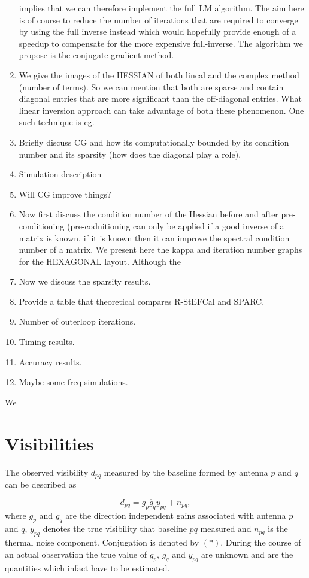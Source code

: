 \documentclass[useAMS,usenatbib]{mn2e}
\newcommand{\conj}[1]{\overline{#1}}
\begin{document}
\begin{enumerate}
 implies that we can therefore implement the full LM algorithm. The aim here is of course to reduce the number of iterations that are required to converge by using the 
 full inverse instead which would hopefully provide enough of a speedup to compensate for the more expensive full-inverse. The algorithm we propose is the conjugate 
 gradient method.
 \item We give the images of the HESSIAN of both lincal and the complex method (number of terms). So we can mention that both are sparse and contain diagonal entries that 
 are more significant than the off-diagonal entries. What linear inversion approach can take advantage of both these phenomenon. One such technique is 
 cg. 
 \item Briefly discuss CG and how its computationally bounded by its condition number and its sparsity (how does the diagonal play a role).
 \item Simulation description
 \item Will CG improve things?
 \item Now first discuss the condition
 number of the Hessian before and after pre-conditioning (pre-codnitioning can only be applied if a good inverse of a matrix is known, if it is known then it can improve 
 the spectral condition number of a matrix. We present here the kappa and iteration number graphs for the HEXAGONAL layout. Although the
 \item Now we discuss the sparsity results. 
 \item Provide a table that theoretical compares R-StEFCal and SPARC.
 \item Number of outerloop iterations. 
 \item Timing results.
 \item Accuracy results.
 \item Maybe some freq simulations.
 \end{enumerate}
 
 We
 
 \section{Visibilities}
The observed visibility $d_{pq}$ measured by the baseline formed by antenna $p$ and $q$ can be described as

\begin{equation}
\label{eq:vis_definition}
d_{pq} = g_{p}\conj{g}_{q}y_{pq} + n_{pq},
\end{equation}
where $g_{p}$ and $g_{q}$ are the direction independent gains associated with antenna $p$ and $q$, $y_{pq}$ denotes the true visibility that baseline $pq$ measured
and $n_{pq}$ is the thermal noise component. Conjugation is denoted by $\conj{(*)}$. During the course of an actual observation the true value of $g_p$, $g_q$ and $y_{pq}$ are unknown and are the quantities which infact have 
to be estimated.
\end{document}
